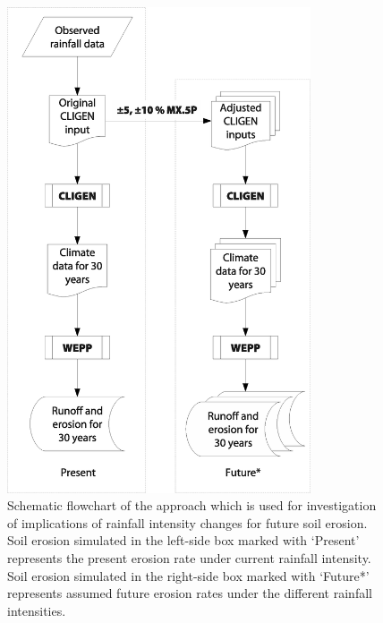 \begin{figure}[htpb]
  \centering
\includegraphics[width=0.8\textwidth]{./img/future_erosion_flowchart}
  \caption[Schematic flowchart of the approach used for investigation of
implications of rainfall intensity changes for future soil erosion]{Schematic
flowchart of the approach which is used for investigation of implications of
rainfall intensity changes for future soil erosion. Soil erosion simulated in
the left-side box marked with `Present' represents the present erosion rate
under current rainfall intensity. Soil erosion simulated in the right-side box
marked with `Future*' represents assumed future erosion rates under the
different rainfall intensities.}
  \label{fig:future_erosion_flowchart}
\end{figure}

